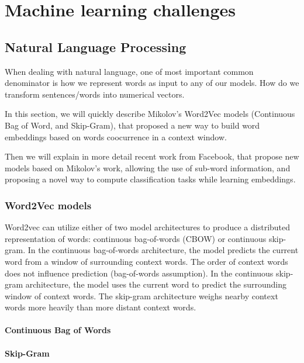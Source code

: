 \chapter{Machine learning challenges}
\label{cha:results}




\section{Natural Language Processing}

When dealing with natural language, one of most important common denominator is how we represent words as input to any of our models. How do we transform sentences/words into numerical vectors.

In this section, we will quickly describe Mikolov's Word2Vec models (Continuous Bag of Word, and Skip-Gram), that proposed a new way to build word embeddings based on words coocurrence in a context window.

Then we will explain in more detail recent work from Facebook, that propose new models based on Mikolov's work, allowing the use of sub-word information, and proposing a novel way to compute classification tasks while learning embeddings.

\subsection{Word2Vec models}

Word2vec can utilize either of two model architectures to produce a distributed representation of words: continuous bag-of-words (CBOW) or continuous skip-gram. In the continuous bag-of-words architecture, the model predicts the current word from a window of surrounding context words. The order of context words does not influence prediction (bag-of-words assumption). In the continuous skip-gram architecture, the model uses the current word to predict the surrounding window of context words. The skip-gram architecture weighs nearby context words more heavily than more distant context words.

\subsubsection*{Continuous Bag of Words}
\subsubsection*{Skip-Gram}

